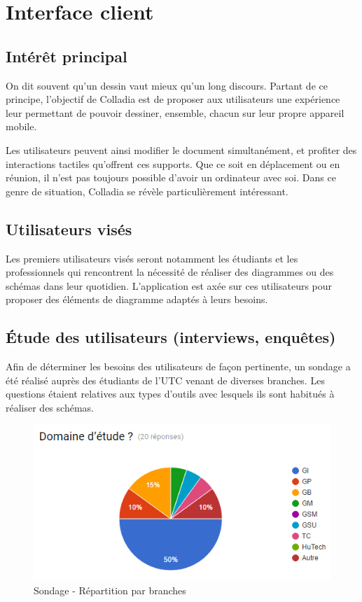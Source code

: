 \newpage
\section{Interface client}
\subsection{Intérêt principal}
On dit souvent qu'un dessin vaut mieux qu'un long discours.
Partant de ce principe, l'objectif de Colladia est de proposer aux utilisateurs une expérience leur permettant de pouvoir dessiner, ensemble, chacun sur leur propre appareil mobile. 

Les utilisateurs peuvent ainsi modifier le document simultanément, et profiter des interactions tactiles qu'offrent ces supports.
Que ce soit en déplacement ou en réunion, il n'est pas toujours possible d'avoir un ordinateur avec soi.
Dans ce genre de situation, Colladia se révèle particulièrement intéressant. 

\subsection{Utilisateurs visés}
Les premiers utilisateurs visés seront notamment les étudiants et les professionnels qui rencontrent la nécessité de réaliser des diagrammes ou des schémas dans leur quotidien.
L'application est axée sur ces utilisateurs pour proposer des éléments de diagramme adaptés à leurs besoins.

\subsection{Étude des utilisateurs (interviews, enquêtes)}
Afin de déterminer les besoins des utilisateurs de façon pertinente, un sondage a été réalisé auprès des étudiants de l’UTC venant de diverses branches.
Les questions étaient relatives aux types d'outils avec lesquels ils sont habitués à réaliser des schémas.

\vspace*{\fill}
\begin{figure}[!h]
	\centering
	\includegraphics[width=.7\textwidth]{img/sondage_branche}
	\caption{Sondage - Répartition par branches}
\end{figure}
\vspace*{\fill}

